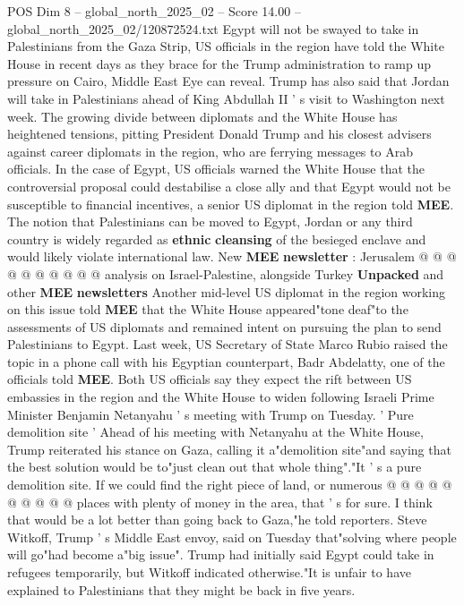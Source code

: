 \begin{textsample}{POS Dim 8 – global\_north\_2025\_02 – Score 14.00 – global\_north\_2025\_02/120872524.txt}  \label{ex:f8_pos_009}
Egypt will not be swayed to take in Palestinians from the Gaza Strip, US officials in the region have told the White House in recent days as they brace for the Trump administration to ramp up pressure on Cairo, Middle East Eye can reveal.
Trump has also said that Jordan will take in Palestinians ahead of King Abdullah II ' s visit to Washington next week.
The growing divide between diplomats and the White House has heightened tensions, pitting President Donald Trump and his closest advisers against career diplomats in the region, who are ferrying messages to Arab officials.
In the case of Egypt, US officials warned the White House that the controversial proposal could destabilise a close ally and that Egypt would not be susceptible to financial incentives, a senior US diplomat in the region told \textbf{MEE}.
The notion that Palestinians can be moved to Egypt, Jordan or any third country is widely regarded as \textbf{ethnic} \textbf{cleansing} of the besieged enclave and would likely violate international law.
New \textbf{MEE} \textbf{newsletter} : Jerusalem @ @ @ @ @ @ @ @ @ @ analysis on Israel-Palestine, alongside Turkey \textbf{Unpacked} and other \textbf{MEE} \textbf{newsletters} Another mid-level US diplomat in the region working on this issue told \textbf{MEE} that the White House appeared"tone deaf"to the assessments of US diplomats and remained intent on pursuing the plan to send Palestinians to Egypt.
Last week, US Secretary of State Marco Rubio raised the topic in a phone call with his Egyptian counterpart, Badr Abdelatty, one of the officials told \textbf{MEE}.
Both US officials say they expect the rift between US embassies in the region and the White House to widen following Israeli Prime Minister Benjamin Netanyahu ' s meeting with Trump on Tuesday. ' Pure demolition site ' Ahead of his meeting with Netanyahu at the White House, Trump reiterated his stance on Gaza, calling it a"demolition site"and saying that the best solution would be to"just clean out that whole thing"."It ' s a pure demolition site.
If we could find the right piece of land, or numerous @ @ @ @ @ @ @ @ @ @ places with plenty of money in the area, that ' s for sure.
I think that would be a lot better than going back to Gaza,"he told reporters.
Steve Witkoff, Trump ' s Middle East envoy, said on Tuesday that"solving where people will go"had become a"big issue".
Trump had initially said Egypt could take in refugees temporarily, but Witkoff indicated otherwise."It is unfair to have explained to Palestinians that they might be back in five years.

\end{textsample}
